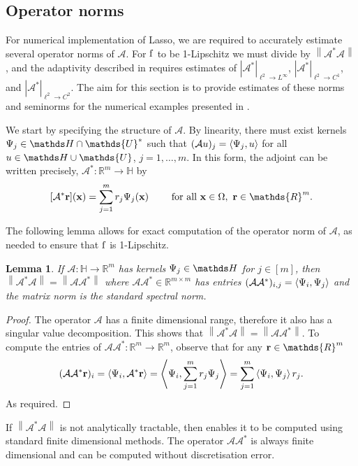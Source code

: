 \documentclass[10pt,a4paper,onecolumn]{article}
\numberwithin{equation}{section}
\newtheorem{lemma}{Lemma}[section]\newtheorem{example}{Example}[section]
\let\F\mathds\let\C\mathcal\newcommand{\R}{\F{R}}\newcommand{\A}{\C{A}}
\newcommand{\norm}[1]{{\left\lVert #1 \right\rVert}}
\newcommand{\IP}[2]{\left\langle #1,#2 \right\rangle}\newcommand{\ip}[2]{#1 \vcenter{\hbox{\resizebox{6pt}{!}{\ensuremath\cdot}}} #2}
\newcommand{\op}[1]{\operatorname{#1}}\newcommand{\overtext}[2]{\stackrel{\text{#1}}{#2}}
\renewcommand{\vec}{\mathbf}
\newcommand{\UCmath}[1]{%
	\begingroup
	\ucmathlist\uppercase\expandafter{#1}%
	\endgroup
}
\newcommand{\ucmathlist}{%
	\def\alpha{\mathrm{A}}%
	\def\beta{\mathrm{B}}%
	\let\gamma=\Gamma
	\let\delta=\Delta
	\def\epsilon{\mathrm{E}}%
	\def\varepsilon{\mathrm{E}}%
	\def\zeta{\mathrm{Z}}%
	\def\eta{\mathrm{H}}%
	\let\theta=\Theta
	\let\vartheta=\Theta
	\def\iota{\mathrm{I}}%
	\def\kappa{\mathrm{K}}%
	\let\lambda=\Lambda
	\def\mu{\mathrm{M}}%
	\def\nu{\mathrm{N}}%
	\let\xi=\Xi
	\let\pi=\Pi
	\let\varpi=\Pi
	\def\rho{\mathrm{P}}%
	\def\varrho{\mathrm{P}}%
	\let\sigma=\Sigma
	\def\tau{\mathrm{T}}%
	\let\upsilon=\Upsilon
	\let\phi=\Phi
	\let\varphi=\Phi
	\def\chi{\mathrm{X}}%
	\let\psi=\Psi
	\let\omega=\Omega
}
\newcommand{\caps}[1]{\UCmath{#1}}
\newcommand*{\func}[1]{%
	\IfEqCase{#1}{%
		{0}{\op{e}}%
		{1}{\op{f}}%
		{2}{\op{g}}%
		{3}{\op{h}}%
	}[\op{f}#1]%
}
\newcommand*{\varf}[1]{%
	\IfEqCase{#1}{%
		{0}{u}%
		{1}{v}%
		{2}{w}%
	}[u#1]%
}
\newcommand*{\spcf}[1]{%
	\IfEqCase{#1}{%
		{0}{\F{U}}%
		{1}{\F{V}}%
		{2}{\F{W}}%
	}[\F{U}#1]%
}
\newcommand*{\vard}[1]{%
	\IfEqCase{#1}{%
		{0}{\varphi}%
		{1}{\psi}%
	}[\varphi #1]%
}
\newcommand*{\varx}[1]{%
	\IfEqCase{#1}{%
		{0}{x}%
		{1}{y}%
		{2}{z}%
		{3}{r}%
	}[x#1]%
}
\newcommand{\Domain}{\Omega}
\newcommand*{\Varx}[1]{\caps{\varx{#1}}}
\newcommand*{\vvarx}[1]{\vec{\varx{#1}}}\newcommand*{\vVarx}[1]{\vec{\Varx{#1}}}
\begin{document}
\subsection{Operator norms}\label{sec:ca: smoothing operators}
For numerical implementation of Lasso, we are required to accurately estimate several operator norms of $\A$. For $\func1$ to be 1-Lipschitz we must divide by $\norm{\A^*\A}$, and the adaptivity described in  requires estimates of $|\A^*|_{\ell^2\to L^\infty}$, $|\A^*|_{\ell^2\to C^1}$, and $|\A^*|_{\ell^2\to C^2}$. The aim for this section is to provide estimates of these norms and seminorms for the numerical examples presented in .

We start by specifying the structure of $\A$. By linearity, there must exist kernels $\vard1_j\in \F H\cap\spcf0^*$ such that $(\A\varf0)_j = \IP{\vard1_j}{\varf0}$ for all $\varf0\in \F H\cup\spcf0$, $j=1,\ldots,m$. In this form, the adjoint can be written precisely, $\A^*\colon\R^m\to \F H$ by 
$$[\A^*\vvarx3](\vvarx0) = \sum_{j=1}^m \varx3_j\vard1_j(\vvarx0) \qquad \text{ for all }\vvarx0\in\Domain,\ \vvarx3\in\R^m.$$

The following lemma allows for exact computation of the operator norm of $\A$, as needed to ensure that $\func1$ is 1-Lipschitz.
\begin{lemma}\label{thm:ca: norm bound L2}
	If $\A\colon \F H \to \R^m$ has kernels $\vard1_j\in \F H$ for $j\in[m]$, then
	$ \norm{\A^*\A} = \norm{\A\A^*} $
	where $\A\A^*\in\R^{m\times m}$ has entries $(\A\A^*)_{i,j} = \IP{\vard1_i}{\vard1_j}$
	and the matrix norm is the standard spectral norm.
\end{lemma}
\begin{proof}
	The operator $\A$ has a finite dimensional range, therefore it also has a singular value decomposition. This shows that $ \norm{\A^*\A} = \norm{\A\A^*} $. To compute the entries of $\A\A^*\colon\R^m\to\R^m$, observe that for any $\vvarx3\in\R^m$
	$$ (\A\A^*\vvarx3)_i = \IP{\vard1_i}{\A^*\vvarx3} = \IP{\vard1_i}{\sum_{j=1}^m\varx3_j\vard1_j} = \sum_{j=1}^m \IP{\vard1_i}{\vard1_j}\varx3_j.$$
	As required.
\end{proof}
If $\norm{\A^*\A}$ is not analytically tractable, then  enables it to be computed using standard finite dimensional methods. The operator $\A\A^*$ is always finite dimensional and can be computed without discretisation error.
\end{document}
